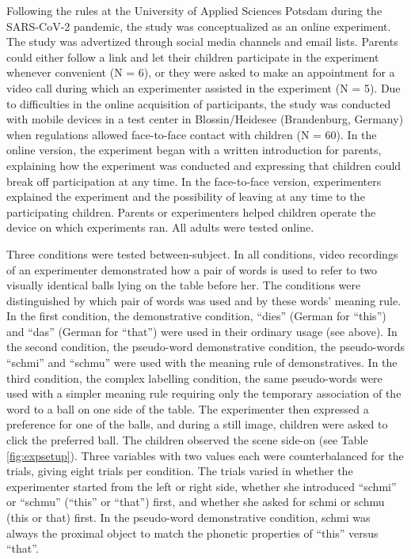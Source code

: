 \documentclass[
  man,floatsintext]{apa6}
\begin{document}
Following the rules at the University of Applied Sciences Potsdam during the SARS-CoV-2 pandemic, the study was conceptualized as an online experiment. The study was advertized through social media channels and email lists. Parents could either follow a link and let their children participate in the experiment whenever convenient (N = 6), or they were asked to make an appointment for a video call during which an experimenter assisted in the experiment (N = 5). Due to difficulties in the online acquisition of participants, the study was conducted with mobile devices in a test center in Blossin/Heidesee (Brandenburg, Germany) when regulations allowed face-to-face contact with children (N = 60). In the online version, the experiment began with a written introduction for parents, explaining how the experiment was conducted and expressing that children could break off participation at any time. In the face-to-face version, experimenters explained the experiment and the possibility of leaving at any time to the participating children. Parents or experimenters helped children operate the device on which experiments ran. All adults were tested online.

Three conditions were tested between-subject. In all conditions, video recordings of an experimenter demonstrated how a pair of words is used to refer to two visually identical balls lying on the table before her. The conditions were distinguished by which pair of words was used and by these words' meaning rule. In the first condition, the demonstrative condition, ``dies'' (German for ``this'') and ``das'' (German for ``that'') were used in their ordinary usage (see above). In the second condition, the pseudo-word demonstrative condition, the pseudo-words ``schmi'' and ``schmu'' were used with the meaning rule of demonstratives. In the third condition, the complex labelling condition, the same pseudo-words were used with a simpler meaning rule requiring only the temporary association of the word to a ball on one side of the table. The experimenter then expressed a preference for one of the balls, and during a still image, children were asked to click the preferred ball. The children observed the scene side-on (see Table \ref{fig:expsetup}). Three variables with two values each were counterbalanced for the trials, giving eight trials per condition. The trials varied in whether the experimenter started from the left or right side, whether she introduced ``schmi'' or ``schmu'' (``this'' or ``that'') first, and whether she asked for schmi or schmu (this or that) first. In the pseudo-word demonstrative condition, schmi was always the proximal object to match the phonetic properties of ``this'' versus ``that''.
\end{document}
